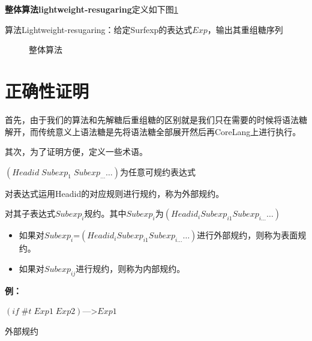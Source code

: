 {\bfseries 整体算法lightweight-resugaring}定义如下图\ref{fig:lwresugar}

算法Lightweight-resugaring：给定Surfexp的表达式$Exp$，输出其重组糖序列\\
\begin{figure}[h]
	\centering
\caption{整体算法}
\label{fig:lwresugar}
\end{figure}


\section{正确性证明}

首先，由于我们的算法和先解糖后重组糖的区别就是我们只在需要的时候将语法糖解开，而传统意义上语法糖是先将语法糖全部展开然后再CoreLang上进行执行。

其次，为了证明方便，定义一些术语。

$(Headid\;Subexp_{1}\;Subexp_{\ldots} \ldots)$为任意可规约表达式

对表达式运用Headid的对应规则进行规约，称为外部规约。

对其子表达式$Subexp_{i}$规约。其中$Subexp_{i}$为$(Headid_{i} Subexp_{i1} Subexp_{i\ldots} \ldots)$
\begin{itemize}
	\item 如果对$Subexp_{i}$=$(Headid_{i} Subexp_{i1} Subexp_{i\ldots} \ldots)$进行外部规约，则称为表面规约。
	\item 如果对$Subexp_{ij}$进行规约，则称为内部规约。
\end{itemize}

{\bfseries 例：}

$(if\; \#t\; Exp1\; Exp2)$--->$Exp1$ \begin{flushright}外部规约\end{flushright}

